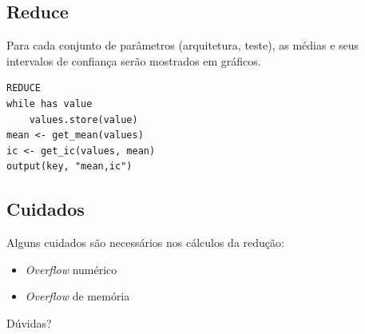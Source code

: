 \documentclass{beamer}
\begin{document}
\subsection{Reduce}
\begin{frame}[fragile]
Para cada conjunto de parâmetros (arquitetura, teste), as médias e seus intervalos de confiança serão mostrados em gráficos.

\begin{verbatim}
REDUCE
while has value
    values.store(value)
mean <- get_mean(values)
ic <- get_ic(values, mean)
output(key, "mean,ic")
\end{verbatim}
\end{frame}

\subsection{Cuidados}
\begin{frame}
Alguns cuidados são necessários nos cálculos da redução:
\begin{itemize}
\item \emph{Overflow} numérico
\item \emph{Overflow} de memória
\end{itemize}
\end{frame}

\begin{frame}
Dúvidas?
\end{frame}
\end{document}
